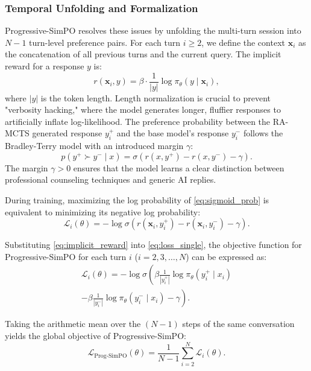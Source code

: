 \documentclass[lettersize,journal]{IEEEtran}
\begin{document}
\subsubsection{Temporal Unfolding and Formalization}
Progressive-SimPO resolves these issues by unfolding the multi-turn session into $N-1$ turn-level preference pairs. For each turn $i \geq 2$, we define the context $\mathbf{x}_i$ as the concatenation of all previous turns and the current query.
The implicit reward for a response $y$ is:
\begin{equation}
\label{eq:implicit_reward}
r(\mathbf{x}_{i}, y) = \beta \cdot \frac{1}{|y|} \log \pi_{\theta}(y \mid \mathbf{x}_{i}),
\end{equation}
where $|y|$ is the token length. Length normalization is crucial to prevent "verbosity hacking," where the model generates longer, fluffier responses to artificially inflate log-likelihood.
The preference probability between the RA-MCTS generated response $y_i^+$ and the base model's response $y_i^-$ follows the Bradley-Terry model with an introduced margin $\gamma$:
\begin{equation}
\label{eq:sigmoid_prob}
p(y^{+} \succ y^{-} \mid x) = \sigma(r(x, y^{+}) - r(x, y^{-}) - \gamma).
\end{equation}
The margin $\gamma > 0$ ensures that the model learns a clear distinction between professional counseling techniques and generic AI replies.

During training, maximizing the log probability of \cref{eq:sigmoid_prob} is equivalent to minimizing its negative log probability:
\begin{equation}
\label{eq:loss_single}
\mathcal{L}_{i}(\theta) = -\log \sigma(r(\mathbf{x}_{i}, y_{i}^{+}) - r(\mathbf{x}_{i}, y_{i}^{-}) - \gamma).
\end{equation}

Substituting \cref{eq:implicit_reward} into \cref{eq:loss_single}, the objective function for Progressive-SimPO for each turn $i$ ($i = 2,3,\dots ,N$) can be expressed as:
\begin{multline}
\mathcal{L}_{i}(\theta) = -\log \sigma \left(\beta \frac{1}{|y_{i}^{+}|} \log \pi_{\theta}(y_{i}^{+} \mid x_{i}) \right. \\
\left. - \beta \frac{1}{|y_{i}^{-}|} \log \pi_{\theta}(y_{i}^{-} \mid x_{i}) - \gamma\right).
\end{multline}

Taking the arithmetic mean over the $(N-1)$ steps of the same conversation yields the global objective of Progressive-SimPO:
\begin{equation}
\mathcal{L}_{\text{Prog-SimPO}}(\theta) = \frac{1}{N - 1} \sum_{i = 2}^{N} \mathcal{L}_{i}(\theta).
\end{equation}
\end{document}
